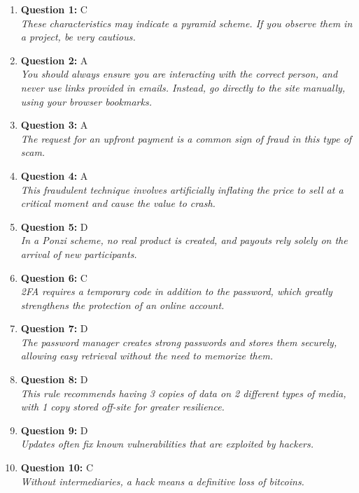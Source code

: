 \documentclass[12pt,a4paper]{article}
\begin{document}
\begin{enumerate}
\item \textbf{Question 1:} C
\\ \textit{These characteristics may indicate a pyramid scheme. If you observe them in a project, be very cautious.}

\item \textbf{Question 2:} A
\\ \textit{You should always ensure you are interacting with the correct person, and never use links provided in emails. Instead, go directly to the site manually, using your browser bookmarks.}

\item \textbf{Question 3:} A
\\ \textit{The request for an upfront payment is a common sign of fraud in this type of scam.}

\item \textbf{Question 4:} A
\\ \textit{This fraudulent technique involves artificially inflating the price to sell at a critical moment and cause the value to crash.}

\item \textbf{Question 5:} D
\\ \textit{In a Ponzi scheme, no real product is created, and payouts rely solely on the arrival of new participants.}

\item \textbf{Question 6:} C
\\ \textit{2FA requires a temporary code in addition to the password, which greatly strengthens the protection of an online account.}

\item \textbf{Question 7:} D
\\ \textit{The password manager creates strong passwords and stores them securely, allowing easy retrieval without the need to memorize them.}

\item \textbf{Question 8:} D
\\ \textit{This rule recommends having 3 copies of data on 2 different types of media, with 1 copy stored off-site for greater resilience.}

\item \textbf{Question 9:} D
\\ \textit{Updates often fix known vulnerabilities that are exploited by hackers.}

\item \textbf{Question 10:} C
\\ \textit{Without intermediaries, a hack means a definitive loss of bitcoins.}


\end{enumerate}
\end{document}
